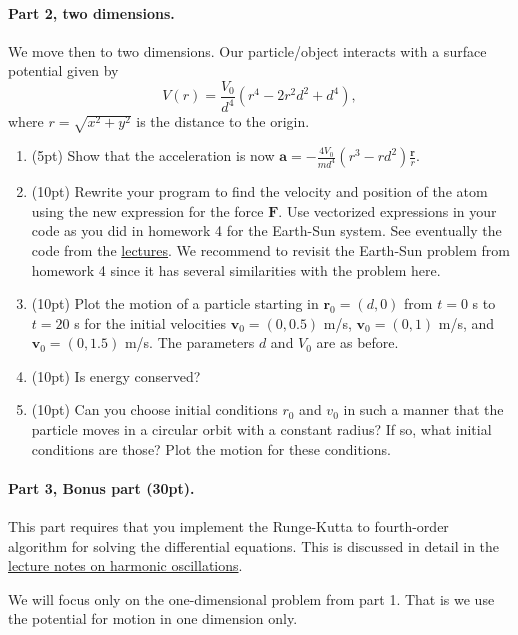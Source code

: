 \documentclass[%
oneside,                 %
final,                   %
10pt]{article}
\begin{document}
\noindent
\paragraph{Part 2, two dimensions.}
We move then to two dimensions. Our particle/object interacts with a surface potential given by
\[
V(r)=\frac{V_0}{d^4}\left(r^4-2r^2d^2+d^4\right),
\]
where $r=\sqrt{x^2+y^2}$ is the distance to the origin.

\begin{enumerate}
\item (5pt) Show that the acceleration is now $\bm{a}=-\frac{4V_0}{md^4}\left(r^3-rd^2\right)\frac{\bm{r}}{r}$.

\item (10pt) Rewrite your program to find the velocity and position of the atom using the new expression for the force $\bm{F}$. Use vectorized expressions in your code as you did in homework 4 for the Earth-Sun system. See eventually the code from the \href{{https://mhjensen.github.io/Physics321/doc/pub/energyconserv/html/energyconserv.html}}{lectures}.  We recommend to revisit the Earth-Sun problem from homework 4 since it has several similarities with the problem here.

\item (10pt) Plot the motion of a particle starting in $\bm{r}_0=(d,0)$ from $t=0$ s to $t=20$ s for the initial velocities $\bm{v}_0=(0,0.5)$ m/s, $\bm{v}_0=(0,1)$ m/s, and $\bm{v}_0=(0,1.5)$ m/s. The parameters $d$ and $V_0$ are as before.

\item (10pt) Is energy conserved? 

\item (10pt) Can you choose initial conditions $r_0$ and $v_0$ in such a manner that the particle moves in a circular orbit with a constant radius? If so, what initial conditions are those? Plot the motion for these conditions.
\end{enumerate}

\noindent
\paragraph{Part 3, Bonus part (30pt).}
This part requires that you implement the Runge-Kutta to fourth-order algorithm for solving the differential equations.
This is discussed in detail in the \href{{https://mhjensen.github.io/Physics321/doc/pub/harmonic/html/harmonic.html}}{lecture notes on harmonic oscillations}.

We will focus only on the one-dimensional problem from part 1. That is we use the potential for motion in one dimension only.
\end{document}
